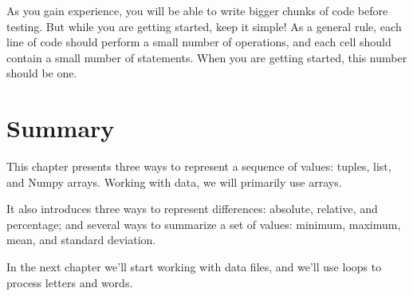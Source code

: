 As you gain experience, you will be able to write bigger chunks of code
before testing. But while you are getting started, keep it simple! As a
general rule, each line of code should perform a small number of
operations, and each cell should contain a small number of statements.
When you are getting started, this number should be one.

\hypertarget{summary}{%
\section{Summary}\label{summary}}

This chapter presents three ways to represent a sequence of values:
tuples, list, and Numpy arrays. Working with data, we will primarily use
arrays.

It also introduces three ways to represent differences: absolute,
relative, and percentage; and several ways to summarize a set of values:
minimum, maximum, mean, and standard deviation.

In the next chapter we'll start working with data files, and we'll use
loops to process letters and words.

